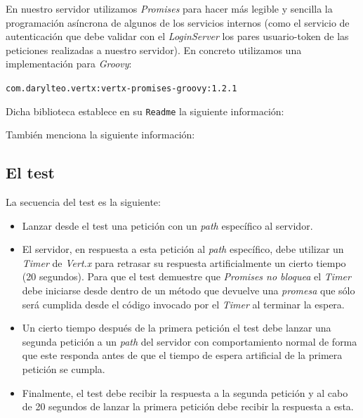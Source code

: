 En nuestro servidor utilizamos \emph{Promises} para hacer más legible y sencilla
la programación asíncrona de algunos de los servicios internos (como el servicio
de autenticación que debe validar con el \emph{LoginServer} los pares 
usuario-token de las peticiones realizadas a nuestro servidor). En concreto utilizamos
una implementación para \emph{Groovy}:

\texttt{com.darylteo.vertx:vertx-promises-groovy:1.2.1}

Dicha biblioteca establece en su \texttt{Readme} la siguiente información:


También menciona la siguiente información:


\subsection{El test}
La secuencia del test es la siguiente:

\begin{itemize}
 \item Lanzar desde el test una petición con un \emph{path} específico al servidor.
 \item El servidor, en respuesta a esta petición al \emph{path} específico,
       debe utilizar un \emph{Timer} de \emph{Vert.x} para retrasar su respuesta
       artificialmente un cierto tiempo (20 segundos). Para que el test
       demuestre que \emph{Promises no bloquea} el \emph{Timer} debe iniciarse
       desde dentro de un método que devuelve una \emph{promesa} que sólo será
       cumplida desde el código invocado por el \emph{Timer} al terminar la
       espera.
 \item Un cierto tiempo después de la primera petición el test debe lanzar una
       segunda petición a un \emph{path} del servidor con comportamiento normal
       de forma que este responda antes de que el tiempo de espera artificial
       de la primera petición se cumpla.
 \item Finalmente, el test debe recibir la respuesta a la segunda petición y
       al cabo de 20 segundos de lanzar la primera petición debe recibir la respuesta
       a esta.
\end{itemize}

